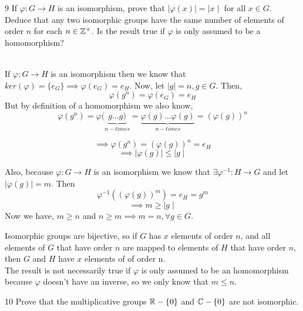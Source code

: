 \documentclass[12pt]{article}
\begin{document}
\newpage
\begin{problem}{9}
    If $\varphi : G \rightarrow H$ is an isomorphism, prove that $\mid \varphi(x) \mid = \mid x \mid $ for all $x \in G$. Deduce that any two isomorphic groups have the same number of elements of order $n$ for each $n \in \mathbb Z^+$. Is the result true if $\varphi$ is only assumed to be a homomorphism?
\end{problem}

\begin{solution}
\bbni \\
    If $\varphi: G \to H$ is an isomorphism then we know that 
    $ker(\varphi) = \{e_G\} \implies \varphi(e_G) = e_H$. Now, let $\mid g \mid = n, g \in G$. 
    Then, 
    \[ \varphi (g^n) = \varphi(e_G) = e_H \]
    But by definition of a homomorphism we also know, 
    \[\varphi(g^n) = \varphi (\underbrace{g \ldots g)}_{n-times} = \underbrace{\varphi(g)\ldots \varphi(g)}_{n-times} =  (\varphi(g))^n \] 

    \[\implies \varphi(g^n) = (\varphi(g))^n = e_H\]
    \[\implies \mid \varphi(g) \mid \leq \mid g \mid \]

    Also, because $\varphi: G \to H$ is an isomorphism we know that $\exists \varphi^{-1} : H \to G$ and let $\mid \varphi(g) \mid = m$. Then 
    \[\varphi^{-1}((\varphi(g))^m) = e_H = g^m\]
    \[\implies m \geq \mid g \mid\]
    Now we have, $m \geq n$ and $n \geq m \implies m = n, \forall g \in G.$

    Isomorphic groups are bijective, so if $G$ has $x$ elements of order $n$, and all elements of $G$ that have order $n$ are mapped to elements of $H$ that have order $n$, then $G$ and $H$ have $x$  elements of of order n. \\

    The result is not necessarily true if $\varphi$ is only assumed to be an homomorphism because $\varphi$ doesn't have an inverse, so we only know that $m \leq n.$
\end{solution}

\newpage

\begin{problem}{10}
    Prove that the multiplicative groups $\mathbb R - \{0\}$ and $\mathbb C - \{0\}$ are not isomorphic.  
\end{problem}
\end{document}
